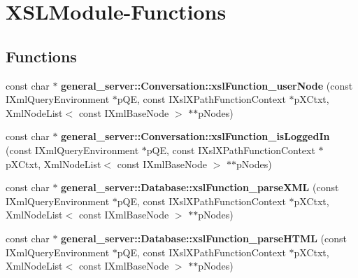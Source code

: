\hypertarget{group__XSLModule-Functions}{\section{\-X\-S\-L\-Module-\/\-Functions}
\label{group__XSLModule-Functions}
}
\subsection*{\-Functions}
\begin{DoxyCompactItemize}
\item 
\hypertarget{group__XSLModule-Functions_gab49d1847468e3d2bdc0f79161e151824}{const char $\ast$ {\bfseries general\-\_\-server\-::\-Conversation\-::xsl\-Function\-\_\-user\-Node} (const \-I\-Xml\-Query\-Environment $\ast$p\-Q\-E, const \-I\-Xsl\-X\-Path\-Function\-Context $\ast$p\-X\-Ctxt, \-Xml\-Node\-List$<$ const \-I\-Xml\-Base\-Node $>$ $\ast$$\ast$p\-Nodes)}\label{group__XSLModule-Functions_gab49d1847468e3d2bdc0f79161e151824}

\item 
\hypertarget{group__XSLModule-Functions_ga1d931c167cd6a70deb467e7674a15628}{const char $\ast$ {\bfseries general\-\_\-server\-::\-Conversation\-::xsl\-Function\-\_\-is\-Logged\-In} (const \-I\-Xml\-Query\-Environment $\ast$p\-Q\-E, const \-I\-Xsl\-X\-Path\-Function\-Context $\ast$p\-X\-Ctxt, \-Xml\-Node\-List$<$ const \-I\-Xml\-Base\-Node $>$ $\ast$$\ast$p\-Nodes)}\label{group__XSLModule-Functions_ga1d931c167cd6a70deb467e7674a15628}

\item 
\hypertarget{group__XSLModule-Functions_gae9e04d1f2be6512c427ead0773aa00ee}{const char $\ast$ {\bfseries general\-\_\-server\-::\-Database\-::xsl\-Function\-\_\-parse\-X\-M\-L} (const \-I\-Xml\-Query\-Environment $\ast$p\-Q\-E, const \-I\-Xsl\-X\-Path\-Function\-Context $\ast$p\-X\-Ctxt, \-Xml\-Node\-List$<$ const \-I\-Xml\-Base\-Node $>$ $\ast$$\ast$p\-Nodes)}\label{group__XSLModule-Functions_gae9e04d1f2be6512c427ead0773aa00ee}

\item 
\hypertarget{group__XSLModule-Functions_ga8bec6b68e06850ec2a73e6c8cb190972}{const char $\ast$ {\bfseries general\-\_\-server\-::\-Database\-::xsl\-Function\-\_\-parse\-H\-T\-M\-L} (const \-I\-Xml\-Query\-Environment $\ast$p\-Q\-E, const \-I\-Xsl\-X\-Path\-Function\-Context $\ast$p\-X\-Ctxt, \-Xml\-Node\-List$<$ const \-I\-Xml\-Base\-Node $>$ $\ast$$\ast$p\-Nodes)}\label{group__XSLModule-Functions_ga8bec6b68e06850ec2a73e6c8cb190972}


\end{DoxyCompactItemize}

